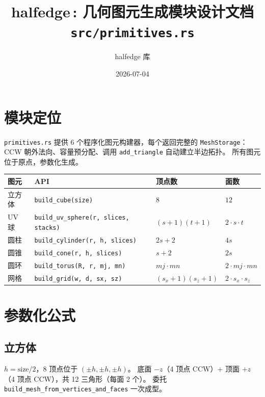 \documentclass[11pt,a4paper]{article}
\title{\textbf{halfedge\,: 几何图元生成模块设计文档} \\ \large \texttt{src/primitives.rs}}
\author{halfedge 库}
\date{2026-07-04}
\begin{document}
\maketitle
\tableofcontents

\section{模块定位}

\texttt{primitives.rs} 提供 6 个程序化图元构建器，每个返回完整的 \texttt{MeshStorage}：
CCW 朝外法向、容量预分配、调用 \texttt{add\_triangle} 自动建立半边拓扑。
所有图元位于原点，参数化生成。

\begin{center}
\renewcommand{\arraystretch}{1.18}
\begin{tabular}{@{}llll@{}}
  \toprule
  \textbf{图元} & \textbf{API} & \textbf{顶点数} & \textbf{面数} \\
  \midrule
  立方体   & \texttt{build\_cube(size)}                              & $8$ & $12$ \\
  UV 球    & \texttt{build\_uv\_sphere(r, slices, stacks)}           & $(s{+}1)(t{+}1)$ & $2 \cdot s \cdot t$ \\
  圆柱     & \texttt{build\_cylinder(r, h, slices)}                  & $2s + 2$ & $4s$ \\
  圆锥     & \texttt{build\_cone(r, h, slices)}                      & $s + 2$ & $2s$ \\
  圆环     & \texttt{build\_torus(R, r, mj, mn)}                     & $mj \cdot mn$ & $2 \cdot mj \cdot mn$ \\
  网格     & \texttt{build\_grid(w, d, sx, sz)}                      & $(s_x{+}1)(s_z{+}1)$ & $2 \cdot s_x \cdot s_z$ \\
  \bottomrule
\end{tabular}
\end{center}

\section{参数化公式}

\subsection{立方体}

$h = \text{size} / 2$，8 顶点位于 $(\pm h, \pm h, \pm h)$。
底面 $-z$（4 顶点 CCW）+ 顶面 $+z$（4 顶点 CCW），共 12 三角形（每面 2 个）。
委托 \texttt{build\_mesh\_from\_vertices\_and\_faces} 一次成型。
\end{document}
